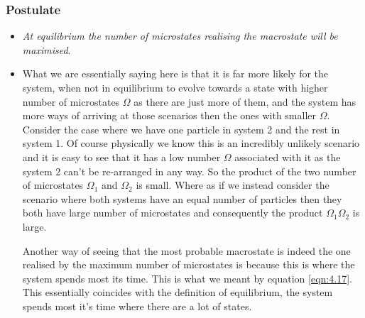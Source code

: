 \documentclass[11pt]{article}
\numberwithin{equation}{section}
\numberwithin{equation}{section}
\begin{document}
\subsubsection{Postulate}
\begin{itemize}
    \item \textit{At equilibrium the number of microstates realising the macrostate will be maximised}.

\item What we are essentially saying here is that it is far more likely for the system, when not in equilibrium to evolve towards a state with higher number of microstates $\Omega$ as there are just more of them, and the system has more ways of arriving at those scenarios then the ones with smaller $\Omega$. Consider the case where we have one particle in system 2 and the rest in system 1. Of course physically we know this is an incredibly unlikely scenario and it is easy to see that it has a low number $\Omega$ associated with it as the system 2 can't be re-arranged in any way. So the product of the two number of microstates $\Omega_1$ and $\Omega_2$ is small. Where as if we instead consider the scenario where both systems have an equal number of particles then they both have large number of microstates and consequently the product $\Omega_1 \Omega_2$ is large. 

Another way of seeing that the most probable macrostate is indeed the one realised by the maximum number of microstates  is because this is where the system spends most its time. This is what we meant by equation \ref{eqn:4.17}.  This essentially coincides with the definition of equilibrium, the system spends most it's time where there are a lot of states. 


\end{itemize}
\end{document}
